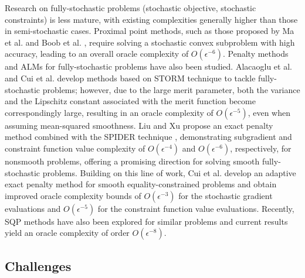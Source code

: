 \documentclass[11pt]{article}
\begin{document}
Research on fully-stochastic problems (stochastic objective, stochastic constraints) is less mature, with existing complexities generally higher than those in semi-stochastic cases. Proximal point methods, such as those proposed by Ma et al. \cite{ma2020quadratically} and Boob et al. \cite{boob2023stochastic}, require solving a stochastic convex subproblem with high accuracy, leading to an overall oracle complexity of \(O(\epsilon^{-6})\). {Penalty {methods and ALMs} for fully-stochastic problems have also been studied.} Alacaoglu et al. \cite{alacaoglu2024complexity} and Cui et al. \cite{cui2025two} develop methods based on STORM technique \cite{cutkosky2019momentum} to tackle fully-stochastic problems; however, due to the {large} merit parameter, {both the variance and the Lipschitz constant associated with the merit function become correspondingly large,} resulting in an oracle complexity of \(O(\epsilon^{-5})\), even when assuming mean-squared smoothness. Liu and Xu \cite{liu2025single} propose an exact penalty method combined with the SPIDER technique \cite{fang2018spider}, demonstrating subgradient and constraint function value complexity of \(O(\epsilon^{-4})\) and \(O(\epsilon^{-6})\), respectively, for nonsmooth problems, offering a promising direction for solving smooth fully-stochastic problems. 
Building on this line of work, Cui et al. \cite{cui2025exact} develop an adaptive exact penalty method for smooth equality-constrained problems and obtain improved oracle complexity bounds of \(O(\epsilon^{-3})\) for the stochastic gradient evaluations  and \(O(\epsilon^{-5})\) for the constraint function value evaluations. 
Recently, SQP methods \cite{shen2025sequential} have also been explored for similar problems and current results yield an oracle complexity of order \(O(\epsilon^{-8})\). 

\subsection{Challenges}
\end{document}

